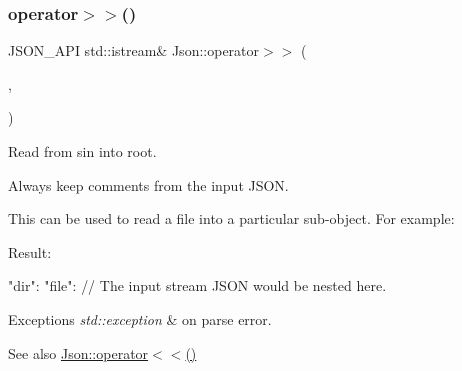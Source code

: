 \subsubsection{\texorpdfstring{operator$>$$>$()}{operator>>()}}
{\footnotesize\ttfamily J\+S\+O\+N\+\_\+\+A\+PI std\+::istream\& Json\+::operator$>$$>$ (\begin{DoxyParamCaption}\item[{std\+::istream \&}]{,  }\item[{\mbox{\hyperlink{class_json_1_1_value}{Value}} \&}]{ }\end{DoxyParamCaption})}



Read from \textquotesingle{}sin\textquotesingle{} into \textquotesingle{}root\textquotesingle{}. 

Always keep comments from the input J\+S\+ON.

This can be used to read a file into a particular sub-\/object. For example\+: 
\begin{DoxyCode}{0}
\end{DoxyCode}
 Result\+: \begin{DoxyVerb}{
"dir": {
    "file": {
    // The input stream JSON would be nested here.
    }
}
}
\end{DoxyVerb}
 
\begin{DoxyExceptions}{Exceptions}
{\em std\+::exception} & on parse error. \\
\hline
\end{DoxyExceptions}
\begin{DoxySeeAlso}{See also}
\mbox{\hyperlink{namespace_json_a0ef6e98bafd4dba52f6ef28ed33913f4}{Json\+::operator$<$$<$()}} 
\end{DoxySeeAlso}
